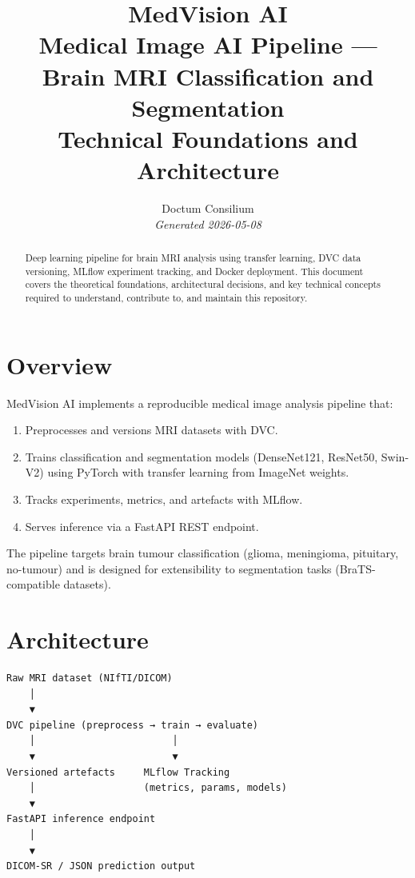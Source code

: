 \documentclass[11pt,a4paper]{article}
\begin{document}
\title{
  \textcolor{doctum}{\Large\textbf{MedVision AI}} \\[0.5em]
  \large Medical Image AI Pipeline — Brain MRI Classification and Segmentation \\[0.3em]
  \normalsize Technical Foundations and Architecture
}
\author{Doctum Consilium \\ \small\textit{Generated 2026-05-08}}
\date{}
\maketitle
\thispagestyle{fancy}

\begin{abstract}
Deep learning pipeline for brain MRI analysis using transfer learning, DVC data versioning, MLflow experiment tracking, and Docker deployment.
This document covers the theoretical foundations, architectural decisions,
and key technical concepts required to understand, contribute to, and
maintain this repository.
\end{abstract}

\tableofcontents
\newpage

\section{Overview}

MedVision AI implements a reproducible medical image analysis pipeline that:
\begin{enumerate}
  \item Preprocesses and versions MRI datasets with DVC.
  \item Trains classification and segmentation models (DenseNet121, ResNet50, Swin-V2)
    using PyTorch with transfer learning from ImageNet weights.
  \item Tracks experiments, metrics, and artefacts with MLflow.
  \item Serves inference via a FastAPI REST endpoint.
\end{enumerate}
The pipeline targets brain tumour classification (glioma, meningioma, pituitary, no-tumour)
and is designed for extensibility to segmentation tasks (BraTS-compatible datasets).


\section{Architecture}

\begin{verbatim}
Raw MRI dataset (NIfTI/DICOM)
    │
    ▼
DVC pipeline (preprocess → train → evaluate)
    │                        │
    ▼                        ▼
Versioned artefacts     MLflow Tracking
    │                   (metrics, params, models)
    ▼
FastAPI inference endpoint
    │
    ▼
DICOM-SR / JSON prediction output
\end{verbatim}
\end{document}
